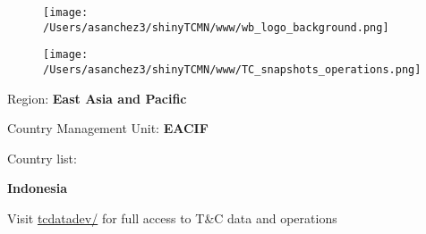 \documentclass{article}\usepackage[]{graphicx}\usepackage[]{color}
\begin{document}
\begin{figure}
  \vspace{-3ex} %
  \hspace{-7ex} %
  \texttt{[image: /Users/asanchez3/shinyTCMN/www/wb\_logo\_background.png]}
\end{figure}
\begin{figure}
  \begin{minipage}[t]{0.99\textwidth} %
      \vspace{-30ex}
      \hspace{-2ex}
      \raggedright{\texttt{[image: /Users/asanchez3/shinyTCMN/www/TC\_snapshots\_operations.png]}}
  \end{minipage}
\end{figure}

\vspace{2ex}
\raggedright{\Large Region: \color{white!30!blue} \textbf{\Large East Asia and Pacific}}

\vspace{2ex}
\raggedright{\Large Country Management Unit: \color{white!30!blue} \textbf{EACIF}}

\vspace{2ex}
\raggedright{\Large Country list:}  

\vspace{2ex}

\raggedright{\textbf{\Large \color{white!30!blue}Indonesia\\
 }}

\vspace{10ex}
\raggedright{\large Visit \href{http://tcdatadev/}{\Large tcdatadev/} for full access to T\&C data and operations}

%
\end{document}
